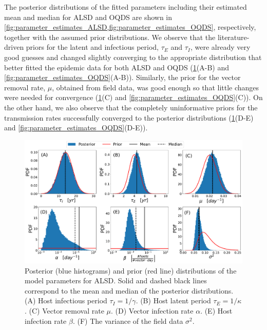 The posterior distributions of the fitted parameters including their
estimated mean and median for ALSD and OQDS are shown in
\cref{fig:parameter_estimates_ALSD,fig:parameter_estimates_OQDS}, respectively,
together with the assumed prior distributions. We observe that the
literature-driven priors for the latent and infectious period, $\tau_E$ and
$\tau_I$, were already very good guesses and changed slightly converging to the
appropriate distribution that better fitted the epidemic data for both ALSD and
OQDS (\cref{fig:parameter_estimates_ALSD}(A-B) and
\cref{fig:parameter_estimates_OQDS}(A-B)). Similarly, the prior for the vector
removal rate, $\mu$, obtained from field data, was good enough so that little
changes were needed for convergence (\cref{fig:parameter_estimates_ALSD}(C) and
\cref{fig:parameter_estimates_OQDS}(C)). On the other hand, we also observe
that the completely uninformative priors for the transmission rates
successfully converged to the posterior distributions
(\cref{fig:parameter_estimates_ALSD}(D-E) and
\cref{fig:parameter_estimates_OQDS}(D-E)).

\begin{figure}[H]
    \centering

    \includegraphics[width=\textwidth]{Figures/Parameter_estimates_ALSD.pdf}
    \caption{Posterior (blue histograms) and prior (red line) distributions
        of the model parameters for ALSD. Solid and dashed black lines
        correspond to
        the mean and median of the posterior distributions. (A) Host infectious
        period
        $\tau_I=1/\gamma$. (B) Host latent period $\tau_E=1/\kappa$.  (C)
        Vector
        removal rate $\mu$. (D) Vector infection rate $\alpha$. (E) Host
        infection rate
        $\beta$. (F) The variance of the field data $\sigma^2$.}
    \label{fig:parameter_estimates_ALSD}
\end{figure}

